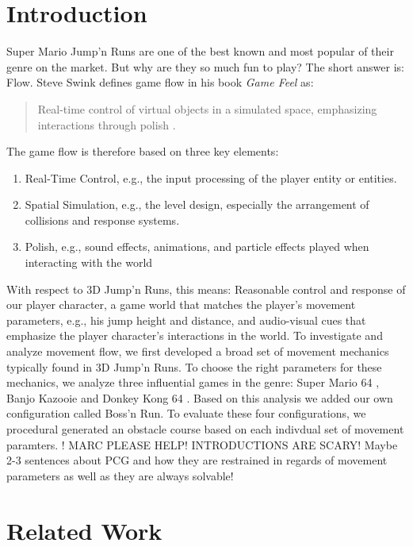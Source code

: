 \documentclass[conference]{IEEEtran}
\begin{document}
\section{Introduction}

Super Mario Jump'n Runs are one of the best known and most popular of their genre on the market.
But why are they so much fun to play?
The short answer is: Flow.
Steve Swink defines game flow in his book \textit{Game Feel} as:

\begin{quote}
    Real-time control of virtual objects in a simulated space, emphasizing interactions through polish \cite{swink2008game}.
\end{quote}

The game flow is therefore based on three key elements:

\begin{enumerate}
    \item Real-Time Control, e.g., the input processing of the player entity or entities.
    \item Spatial Simulation, e.g., the level design, especially the arrangement of collisions and response systems.
    \item Polish, e.g., sound effects, animations, and particle effects played when interacting with the world
\end{enumerate}

With respect to 3D Jump'n Runs, this means: Reasonable control and response of our player character, a game world that matches the player's movement parameters, e.g., his jump height and distance, and audio-visual cues that emphasize the player character's interactions in the world.
To investigate and analyze movement flow, we first developed a broad set of movement mechanics typically found in 3D Jump'n Runs.
To choose the right parameters for these mechanics, we analyze three influential games in the genre: Super Mario 64 \cite{SuperMario64}, Banjo Kazooie \cite{BanjoKazooie} and Donkey Kong 64 \cite{DonkeyKong64}.
Based on this analysis we added our own configuration called Boss'n Run.
To evaluate these four configurations, we procedural generated an obstacle course based on each indivdual set of movement paramters. 
! MARC PLEASE HELP! INTRODUCTIONS ARE SCARY! 
Maybe 2-3 sentences about PCG and how they are restrained in regards of movement parameters as well as they are always solvable!

\section{Related Work}
\label{Sec:RelatedWork}
\end{document}
